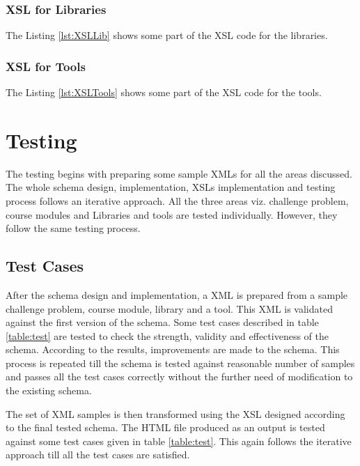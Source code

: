 \documentclass[11pt,letterpaper]{report}
\begin{document}
\subsection{XSL for Libraries}
The Listing \ref{lst:XSLLib} shows some part of the XSL code for the libraries. 

\subsection{XSL for Tools}
The Listing \ref{lst:XSLTools} shows some part of the XSL code for the tools. 


\chapter{Testing}

The testing begins with preparing some sample XMLs for all the areas discussed. The whole schema design, implementation, XSLs implementation and testing process follows an iterative approach. All the three areas viz. challenge problem, course modules and Libraries and tools are tested individually. However, they follow the same testing process. 

\section{Test Cases}
After the schema design and implementation, a XML is prepared from a sample challenge problem, course module, library and a tool. This XML is validated against the first version of the schema. Some test cases described in table \ref{table:test} are tested to check the strength, validity and effectiveness of the schema. According to the results, improvements are made to the schema. This process is repeated till the schema is tested against reasonable number of samples and passes all the test cases correctly without the further need of modification to the existing schema. 

The set of XML samples is then transformed using the XSL designed according to the final tested schema. The HTML file produced as an output is tested against some test cases given in table \ref{table:test}. This again follows the iterative approach till all the test cases are satisfied.
\end{document}
